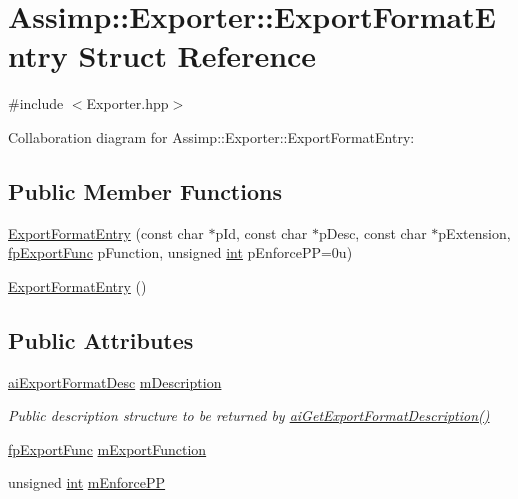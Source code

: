 \hypertarget{struct_assimp_1_1_exporter_1_1_export_format_entry}{\section{Assimp\-:\-:Exporter\-:\-:Export\-Format\-Entry Struct Reference}
\label{struct_assimp_1_1_exporter_1_1_export_format_entry}
}


{\ttfamily \#include $<$Exporter.\-hpp$>$}



Collaboration diagram for Assimp\-:\-:Exporter\-:\-:Export\-Format\-Entry\-:
\subsection*{Public Member Functions}
\begin{DoxyCompactItemize}
\item 
\hyperlink{struct_assimp_1_1_exporter_1_1_export_format_entry_ab89610d7a5b295aa8a22bceae013d76f}{Export\-Format\-Entry} (const char $\ast$p\-Id, const char $\ast$p\-Desc, const char $\ast$p\-Extension, \hyperlink{class_assimp_1_1_exporter_aa67334a75cb24e030af984d01e622f3b}{fp\-Export\-Func} p\-Function, unsigned \hyperlink{_s_d_l__thread_8h_a6a64f9be4433e4de6e2f2f548cf3c08e}{int} p\-Enforce\-P\-P=0u)
\item 
\hyperlink{struct_assimp_1_1_exporter_1_1_export_format_entry_a6a34ccd6431d47d6a9fd6d1a498d1ee5}{Export\-Format\-Entry} ()
\end{DoxyCompactItemize}
\subsection*{Public Attributes}
\begin{DoxyCompactItemize}
\item 
\hyperlink{structai_export_format_desc}{ai\-Export\-Format\-Desc} \hyperlink{struct_assimp_1_1_exporter_1_1_export_format_entry_a59f8bf48e35a70ac0540c9b65d4b891d}{m\-Description}
\begin{DoxyCompactList}\small\item\em Public description structure to be returned by \hyperlink{cexport_8h_adda7f2e6611f719af6c8a4a0bef0a0a2}{ai\-Get\-Export\-Format\-Description()} \end{DoxyCompactList}\item 
\hyperlink{class_assimp_1_1_exporter_aa67334a75cb24e030af984d01e622f3b}{fp\-Export\-Func} \hyperlink{struct_assimp_1_1_exporter_1_1_export_format_entry_a5cf4464ae6f7f7d92aaade27f1e545f5}{m\-Export\-Function}
\item 
unsigned \hyperlink{_s_d_l__thread_8h_a6a64f9be4433e4de6e2f2f548cf3c08e}{int} \hyperlink{struct_assimp_1_1_exporter_1_1_export_format_entry_aefb2d077aebc473ce9a6e38fd883f181}{m\-Enforce\-P\-P}
\end{DoxyCompactItemize}


